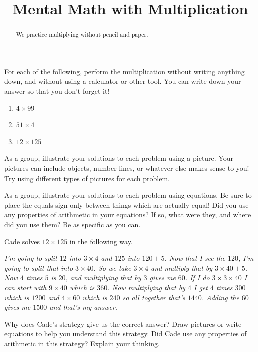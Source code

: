 \documentclass[nooutcomes,noauthor,handout]{ximera}
\title{Mental Math with Multiplication}
\begin{document}
\begin{abstract} We practice multiplying without pencil and paper. \end{abstract}
\maketitle


\begin{problem}
For each of the following, perform the multiplication without writing anything down, and without using a calculator or other tool. You can write down your answer so that you don't forget it!

\begin{enumerate}
\item $4 \times 99$
\item $51 \times 4$
\item $12 \times 125$

\end{enumerate}

\end{problem}


\begin{problem}
As a group, illustrate your solutions to each problem using a picture. Your pictures can include objects, number lines, or whatever else makes sense to you! Try using different types of pictures for each problem.
\end{problem}


\begin{problem}
As a group, illustrate your solutions to each problem using equations. Be sure to place the equals sign only between things which are actually equal! Did you use any properties of arithmetic in your equations? If so, what were they, and where did you use them? Be as specific as you can.

\end{problem}


\begin{problem}
Cade solves $12 \times 125$ in the following way. 

\emph{I'm going to split $12$ into $3 \times 4$ and $125$ into $120 + 5$. Now that I see the $120$, I'm going to split that into $3 \times 40$. So we take $3 \times 4$ and multiply that by $3 \times 40 + 5$. Now $4$ times $5$ is $20$, and multiplying that by $3$ gives me $60$. If I do $3 \times 3 \times 40$ I can start with $9 \times 40$ which is $360$. Now multiplying that by $4$ I get $4$ times $300$ which is $1200$ and $4 \times 60$ which is $240$ so all together that's $1440$. Adding the $60$ gives me $1500$ and that's my answer.}

Why does Cade's strategy give us the correct answer? Draw pictures or write equations to help you understand this strategy. Did Cade use any properties of arithmetic in this strategy?  Explain your thinking.
\end{problem}
\end{document}
